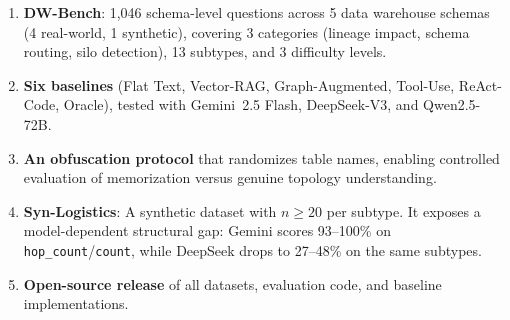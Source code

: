 \begin{enumerate}
  \item \textbf{DW-Bench}: 1,046 schema-level questions
    across 5 data warehouse schemas (4 real-world, 1 synthetic), covering
    3 categories (lineage impact, schema routing, silo detection),
    13 subtypes, and 3 difficulty levels.
  \item \textbf{Six baselines} (Flat Text, Vector-RAG, Graph-Augmented,
    Tool-Use, ReAct-Code, Oracle), tested with Gemini~2.5 Flash,
    DeepSeek-V3, and Qwen2.5-72B.
  \item \textbf{An obfuscation protocol} that randomizes table names,
    enabling controlled evaluation of memorization versus genuine topology
    understanding.
  \item \textbf{Syn-Logistics}: A synthetic dataset with $n \geq 20$ per
    subtype.  It exposes a model-dependent structural gap: Gemini scores
    93--100\% on \texttt{hop\_count}/\texttt{count}, while DeepSeek drops to
    27--48\% on the same subtypes.
  \item \textbf{Open-source release} of all datasets, evaluation code, and
    baseline implementations.
\end{enumerate}
